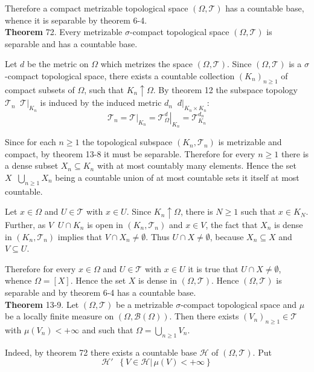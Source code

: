 \documentclass[a4paper]{article}
\newcommand{\obj}[1]{\left\{ #1 \right \}}
\newcommand{\clo}[1]{\left [ #1 \right ]}
\newcommand{\brac}[1]{\left ( #1 \right )}
\newcommand{\induc}[1]{\left . #1 \right \vert}
\newcommand{\Tcal}{\mathcal{T}}
\newcommand{\Hcal}{\mathcal{H}}
\newcommand{\borel}[1]{\mathcal{B}\brac{#1}}
\newcommand{\defn}{\mathop{\overset{\Delta}{=}}\nolimits}
\begin{document}
Therefore a compact metrizable topological space $\brac{\Omega,\Tcal}$ has a countable base, whence it is separable by theorem 6-4.\\

\label{thm:metr_sigma_compact_base} \noindent \textbf{Theorem} 72.
Every metrizable $\sigma$-compact topological space $\brac{\Omega, \Tcal}$ is separable and has a countable base.

Let $d$ be the metric on $\Omega$ which metrizes the space $\brac{\Omega, \Tcal}$. Since $\brac{\Omega, \Tcal}$ is a $\sigma$-compact topological space, there exists a countable collection $\brac{K_n}_{n\geq1}$ of compact subsets of $\Omega$, such that $K_n\uparrow \Omega$. By theorem 12 the subspace topology $\Tcal_n\defn \induc{\Tcal}_{K_n}$ is induced by the induced metric $d_n\defn \induc{d}_{K_n\times K_n}$:\[\Tcal_n = \induc{\Tcal}_{K_n} = \induc{\Tcal^d_\Omega}_{K_n} = \Tcal^{d_n}_{K_n}\]

Since for each $n\geq1$ the topological subspace $\brac{K_n,\Tcal_n}$ is metrizable and compact, by theorem 13-8 it must be separable. Therefore for every $n\geq1$ there is a dense subset $X_n\subseteq K_n$ with at most countably many elements. Hence the set $X\defn \bigcup_{n\geq1} X_n$ being a countable union of at most countable sets it itself at most countable.

Let $x\in \Omega$ and $U\in \Tcal$ with $x\in U$. Since $K_n\uparrow \Omega$, there is $N\geq1$ such that $x\in K_N$. Further, as $V\defn U\cap K_n$ is open in $\brac{K_n,\Tcal_n}$ and $x\in V$, the fact that $X_n$ is dense in $\brac{K_n,\Tcal_n}$ implies that $V\cap X_n \neq \emptyset$. Thus $U\cap X\neq \emptyset$, because $X_n\subseteq X$ and $V\subseteq U$.

Therefore for every $x\in \Omega$ and $U\in \Tcal$ with $x\in U$ it is true that $U\cap X\neq \emptyset$, whence $\Omega = \clo{X}$. Hence the set $X$ is dense in $\brac{\Omega,\Tcal}$. Hence $\brac{\Omega, \Tcal}$ is separable and by theorem 6-4 has a countable base.\\

\label{thm:metr_sigma_compact_count_cover} \noindent \textbf{Theorem} 13-9.
Let $\brac{\Omega, \Tcal}$ be a metrizable $\sigma$-compact topological space and $\mu$ be a locally finite measure on $\brac{\Omega,\borel{\Omega}}$. Then there exists $\brac{V_n}_{n\geq1}\in \Tcal$ with $\mu\brac{V_n}<+\infty$ and such that $\Omega = \bigcup_{n\geq1} V_n$.

Indeed, by theorem 72 there exists a countable base $\Hcal$ of $\brac{\Omega,\Tcal}$. Put \[\Hcal'\defn \obj{\induc{V\in \Hcal}\,\mu\brac{V}<+\infty}\]
\end{document}
